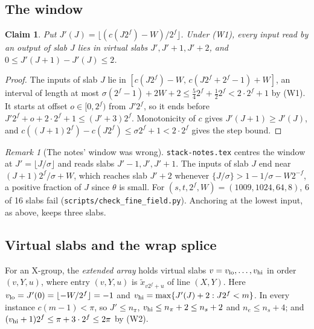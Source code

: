\documentclass[11pt]{article}
\newtheorem{claim}{Claim}
\theoremstyle{definition}\newtheorem{definition}{Definition}
\theoremstyle{remark}\newtheorem*{remark}{Remark}
\begin{document}
\subsection{The window}
\begin{claim}\label{cl:window}
Put $J'(J)=\lfloor(c(J2^f)-W)/2^f\rfloor$. Under (W1), every input read by an output of slab $J$
lies in virtual slabs $J',J'+1,J'+2$, and $0\le J'(J+1)-J'(J)\le2$.
\end{claim}
\begin{proof}
The inputs of slab $J$ lie in $[c(J2^f)-W,\,c(J2^f+2^f-1)+W]$, an interval of length at most
$\sigma(2^f-1)+2W+2\le\tfrac54 2^f+\tfrac12 2^f<2\cdot2^f+1$ by (W1). It starts at offset
$o\in[0,2^f)$ from $J'2^f$, so it ends before $J'2^f+o+2\cdot2^f+1\le(J'+3)2^f$. Monotonicity
of $c$ gives $J'(J+1)\ge J'(J)$, and $c((J+1)2^f)-c(J2^f)\le\sigma2^f+1<2\cdot2^f$ gives the step
bound.
\end{proof}

\begin{remark}[The notes' window was wrong]
\texttt{stack-notes.tex} centres the window at $J'=\lfloor J/\sigma\rfloor$ and reads slabs
$J'-1,J',J'+1$. The inputs of slab $J$ end near $(J+1)2^f/\sigma+W$, which reaches slab $J'+2$
whenever $\{J/\sigma\}>1-1/\sigma-W2^{-f}$, a positive fraction of $J$ since $\theta$ is small.
For $(s,t,2^f,W)=(1009,1024,64,8)$, 6 of 16 slabs fail (\texttt{scripts/check\_fine\_field.py}). Anchoring at the
lowest input, as above, keeps three slabs.
\end{remark}

\subsection{Virtual slabs and the wrap splice}
For an X-group, the \emph{extended array} holds virtual slabs $v=v_{\rm lo},\dots,v_{\rm hi}$ in
order $(v,Y,u)$, where entry $(v,Y,u)$ is $\tilde x_{v2^f+u}$ of line $(X,Y)$. Here
$v_{\rm lo}=J'(0)=\lfloor-W/2^f\rfloor=-1$ and $v_{\rm hi}=\max\{J'(J)+2: J2^f<m\}$. In
every instance $c(m-1)<\pi$, so $J'\le n_\pi$, $v_{\rm hi}\le n_\pi+2\le n_s+2$ and
$n_e\le n_s+4$; and $(v_{\rm hi}+1)2^f\le\pi+3\cdot2^f\le2\pi$ by (W2).
\end{document}
